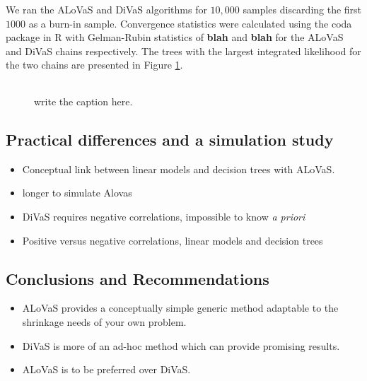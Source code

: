 We ran the ALoVaS and DiVaS algorithms for $10,000$ samples discarding the first $1000$ as a burn-in sample. Convergence statistics were calculated using the coda package in R with Gelman-Rubin statistics of \textbf{blah} and \textbf{blah} for the ALoVaS and DiVaS chains respectively. The trees with the largest integrated likelihood for the two chains are presented in Figure \ref{fig:chain_max_interaction_tree}.  

\begin{figure}
\begin{center} 
\begin{tabular}{cc}
\end{tabular}
\caption{write the caption here.}
\label{fig:chain_max_interaction_tree}
\end{center}
\end{figure} 

\subsection{Practical differences and a simulation study}

\begin{itemize}
\item Conceptual link between linear models  and decision trees with ALoVaS. 
\item longer to simulate Alovas 
\item DiVaS requires negative correlations, impossible to know \emph{a priori}
\item Positive versus negative correlations, linear models and decision trees
\end{itemize}

\subsection{Conclusions and Recommendations}

\begin{itemize}
\item ALoVaS provides a conceptually simple generic method adaptable to the shrinkage needs of your own problem. 
\item DiVaS is more of an ad-hoc method which can provide promising results. 
\item ALoVaS is to be preferred over DiVaS. 
\end{itemize}

